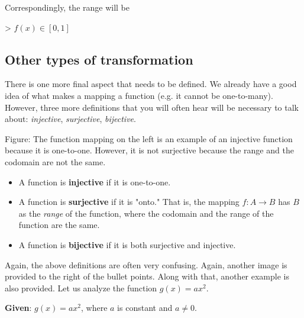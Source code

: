 Correspondingly, the range will be



> $f(x)\in[0,1]$




\subsection{Other types of transformation}
\label{sss:othe-065a}




There is one more final aspect that needs to be defined. We already have a good idea of
what makes a mapping a function (e.g. it cannot be one-to-many). However, three more
definitions that you will often hear will be necessary to talk about: \textit{injective},
\textit{surjective}, \textit{bijective}.






Figure: The function mapping on the left is an example of an injective function because it
is one-to-one. However, it is not surjective because the range and the codomain are not
the same.



\begin{itemize}
    \item A function is \textbf{injective} if it is one-to-one.
    \item A function is \textbf{surjective} if it is "onto." That is, the mapping $f:A\to B$ has $B$ as the \textit{range} of the function, where the codomain and the range of the function are the same.
    \item A function is \textbf{bijective} if it is both surjective and injective.
\end{itemize}

Again, the above definitions are often very confusing. Again, another image is provided to
the right of the bullet points. Along with that, another example is also provided. Let us
analyze the function $g(x)=ax^{2}$.



\textbf{Given}: $g(x)=ax^{2}$, where $a$ is constant and $a\ne0$.



